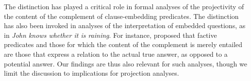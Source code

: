 \documentclass[11pt,fleqn]{article}
\newcommand{\6}{\mbox{$[\hspace*{-.6mm}[$}}
\newcommand{\9}{\mbox{$]\hspace*{-.6mm}]$}}
\begin{document}
\newpage

The distinction has played a critical role in formal analyses of the projectivity of the content of the complement of clause-embedding predicates. The distinction has also been invoked in analyses of the interpretation of embedded questions, as in {\em John knows whether it is raining}. For instance, \citet{spector-egre2015} proposed that factive predicates and those for which the content of the complement is merely entailed are those that express a relation to the actual true answer, as opposed to a potential answer. Our findings are thus also relevant for such analyses, though we limit the discussion to implications for projection analyses.

\newpage
\end{document}
